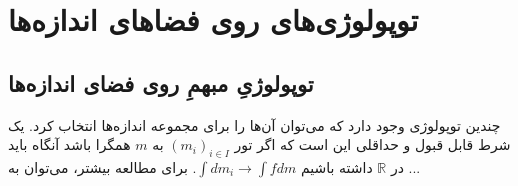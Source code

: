 \chapter{‌توپولوژی‌های روی فضاهای اندازه‌ها}
\section{ توپولوژیِ مبهمِ روی فضای اندازه‌ها}
چندین توپولوژی وجود دارد که می‌توان آن‌ها را برای مجموعه اندازه‌ها انتخاب کرد. یک شرط قابل قبول و حداقلی این است که  اگر  تور
 $ (m_{i})_{i\in I} $
به 
$ m $
همگرا باشد آنگاه  باید در 
$\mathbb{R}  $
داشته باشیم 
$\int dm_{i}\to \int fdm  $.
برای مطالعه بیشتر، می‌توان به ...
